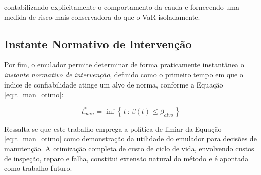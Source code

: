 contabilizando explicitamente o comportamento da cauda e fornecendo uma medida de risco mais conservadora do que o VaR isoladamente.

\subsection{Instante Normativo de Intervenção}

Por fim, o emulador permite determinar de forma praticamente instantânea o \textit{instante normativo de intervenção}, definido como o primeiro tempo em que o índice de confiabilidade atinge um alvo de norma, conforme a Equação \eqref{eq:t_man_otimo}:

\begin{equation}\label{eq:t_man_otimo}
t_{man}^{*} = \inf\left\{\, t \,:\, \beta(t) \leq \beta_{alvo} \,\right\}
\end{equation}

Ressalta-se que este trabalho emprega a política de limiar da Equação \eqref{eq:t_man_otimo} como demonstração da utilidade do emulador para decisões de manutenção. A otimização completa de custo de ciclo de vida, envolvendo custos de inspeção, reparo e falha, constitui extensão natural do método e é apontada como trabalho futuro.
